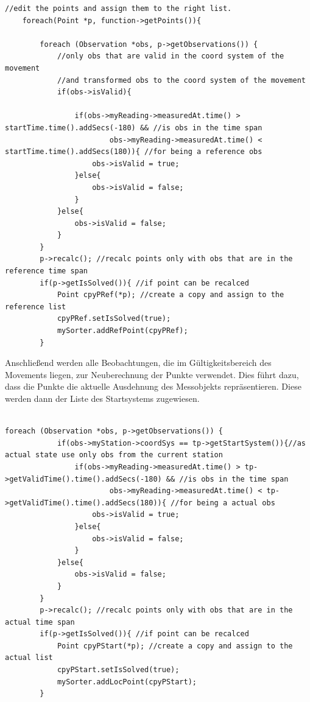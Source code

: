 \begin{lstlisting}[caption={Berechnung Referenzpunkte},captionpos=t]
//edit the points and assign them to the right list.
    foreach(Point *p, function->getPoints()){

        foreach (Observation *obs, p->getObservations()) {
            //only obs that are valid in the coord system of the movement
            //and transformed obs to the coord system of the movement
            if(obs->isValid){

                if(obs->myReading->measuredAt.time() > startTime.time().addSecs(-180) && //is obs in the time span
                        obs->myReading->measuredAt.time() < startTime.time().addSecs(180)){ //for being a reference obs
                    obs->isValid = true;
                }else{
                    obs->isValid = false;
                }
            }else{
                obs->isValid = false;
            }
        }
        p->recalc(); //recalc points only with obs that are in the reference time span
        if(p->getIsSolved()){ //if point can be recalced
            Point cpyPRef(*p); //create a copy and assign to the reference list
            cpyPRef.setIsSolved(true);
            mySorter.addRefPoint(cpyPRef);
        }
\end{lstlisting}

Anschließend werden alle Beobachtungen, die im Gültigkeitsbereich des Movements liegen, zur Neuberechnung der Punkte verwendet. Dies führt dazu, dass die Punkte die aktuelle Ausdehnung des Messobjekts repräsentieren. Diese werden dann der Liste des Startsystems zugewiesen.

\begin{lstlisting}[caption={Berechnung der Punkte des Startsystems},captionpos=t]

foreach (Observation *obs, p->getObservations()) {
            if(obs->myStation->coordSys == tp->getStartSystem()){//as actual state use only obs from the current station
                if(obs->myReading->measuredAt.time() > tp->getValidTime().time().addSecs(-180) && //is obs in the time span
                        obs->myReading->measuredAt.time() < tp->getValidTime().time().addSecs(180)){ //for being a actual obs
                    obs->isValid = true;
                }else{
                    obs->isValid = false;
                }
            }else{
                obs->isValid = false;
            }
        }
        p->recalc(); //recalc points only with obs that are in the actual time span
        if(p->getIsSolved()){ //if point can be recalced
            Point cpyPStart(*p); //create a copy and assign to the actual list
            cpyPStart.setIsSolved(true);
            mySorter.addLocPoint(cpyPStart);
        }
\end{lstlisting}

